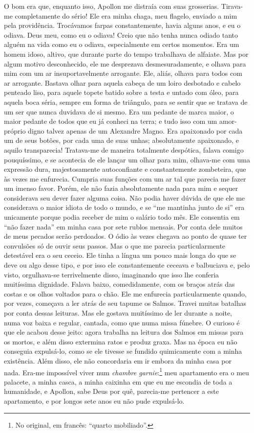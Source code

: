 O bom era que, enquanto isso, Apollon me distraía com suas grosserias.
Tirava-me completamente do sério! Ele era minha chaga, meu flagelo,
enviado a mim pela providência. Trocávamos farpas constantemente,
havia alguns anos, e eu o odiava. Deus meu, como eu o odiava! Creio que
não tenha nunca odiado tanto alguém na vida como eu o odiava,
especialmente em certos momentos. Era um homem idoso, altivo, que
durante parte do tempo trabalhava de alfaiate. Mas por algum motivo
desconhecido, ele me desprezava desmesuradamente, e olhava para mim com
um ar insuportavelmente arrogante. Ele, aliás, olhava para todos com ar
arrogante. Bastava olhar para aquela cabeça de um loiro desbotado e
cabelo penteado liso, para aquele topete batido sobre a testa e untado
com óleo, para aquela boca séria, sempre em forma de triângulo, para se
sentir que se tratava de um ser que nunca duvidava de si mesmo. Era um
pedante de marca maior, o maior pedante de todos que eu já conheci na
terra; e tudo isso com um amor-próprio digno talvez apenas de um
Alexandre Magno. Era apaixonado por cada um de seus botões, por cada
uma de suas unhas; absolutamente apaixonado, e aquilo transparecia!
Tratava-me de maneira totalmente despótica, falava comigo pouquíssimo,
e se acontecia de ele lançar um olhar para mim, olhava-me com uma
expressão dura, majestosamente autoconfiante e constantemente
zombeteira, que às vezes me enfurecia. Cumpria suas funções com um ar
tal que parecia me fazer um imenso favor. Porém, ele não fazia
absolutamente nada para mim e sequer considerava seu dever fazer alguma
coisa. Não podia haver dúvida de que ele me considerava o maior idiota
de todo o mundo, e se “me mantinha junto de si” era unicamente porque
podia receber de mim o salário todo mês. Ele consentia em “não fazer
nada” em minha casa por sete rublos mensais. Por conta dele muitos de
meus pecados serão perdoados. O ódio às vezes chegava ao ponto de quase
ter convulsões só de ouvir seus passos. Mas o que me parecia
particularmente detestável era o seu ceceio. Ele tinha a língua um
pouco mais longa do que se deve ou algo desse tipo, e por isso ele
constantemente ceceava e balbuciava e, pelo visto, orgulhava-se
terrivelmente disso, imaginando que isso lhe conferia muitíssima
dignidade. Falava baixo, comedidamente, com os braços atrás das costas
e os olhos voltados para o chão. Ele me enfurecia particularmente
quando, por vezes, começava a ler atrás de seu tapume os Salmos. Travei
muitas batalhas por conta dessas leituras. Mas ele gostava muitíssimo
de ler durante a noite, numa voz baixa e regular, cantada, como que
numa missa fúnebre. O curioso é que ele acabou desse jeito: agora
trabalha na leitura dos Salmos em missas para os mortos, e além disso
extermina ratos e produz graxa. Mas na época eu não conseguia
expulsá-lo, como se ele tivesse se fundido quimicamente com a minha
existência. Além disso, ele não concordaria em ir embora da minha casa
por nada. Era-me impossível viver num \textit{chambre
garnie}:\footnote{ No original, em francês: “quarto
mobiliado”.} meu apartamento era o meu palacete, a minha casca, a minha
caixinha em que eu me escondia de toda a humanidade, e Apollon, sabe
Deus por quê, parecia-me pertencer a este apartamento, e por longos
sete anos eu não pude expulsá-lo.

